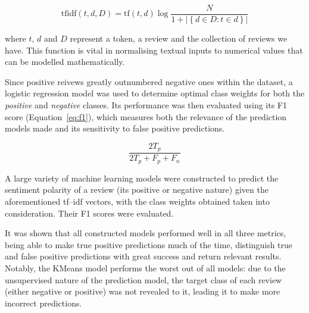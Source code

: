 \documentclass[11pt, a4paper]{pancake-article}
\begin{document}
\begin{equation}
	\text{tfidf}\left(t, d, D\right) = \text{tf}\left(t, d\right)\log\frac{N}{1 + \left|\left\{d \in D : t\in d\right\}\right|}
	\label{eq:tf-idf}
\end{equation}

where \(t\), \(d\) and \(D\) represent a token, a review and the collection of reviews we have. This function is vital
in normalising textual inputs to numerical values that can be modelled mathematically.

Since positive reivews greatly outnumbered negative ones within the dataset, a logistic regression model was used to
determine optimal class weights for both the \textit{positive} and \textit{negative} classes. Its performance was then evaluated using its F1 score (Equation~\ref{eq:f1}), which measures both the relevance of the prediction models made and its sensitivity to false positive predictions.

\begin{equation}
	\frac{2 T_p}{2 T_p + F_p + F_n}
	\label{eq:f1}
\end{equation}

A large variety of machine learning models were constructed
to predict the sentiment polarity of a review (its positive or negative nature) given the aforementioned tf--idf vectors, with
the class weights obtained taken into consideration. Their F1 scores were evaluated.

It was shown that all constructed models performed well in all three metrics, being
able to make true positive predictions much of the time, distinguish true and false
positive predictions with great success and return relevant results. Notably, the KMeans
model performs the worst out of all models: due to the unsupervised nature of the prediction
model, the target class of each review (either negative or positive) was not revealed to it,
leading it to make more incorrect predictions.
\end{document}
